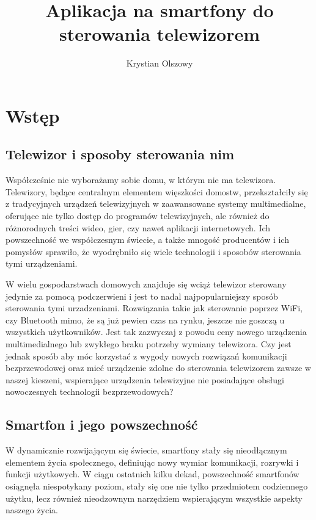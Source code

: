 \documentclass[12pt,twoside]{article}
\author{Krystian Olszowy}
\title{Aplikacja na smartfony do sterowania telewizorem}
\begin{document}
\maketitle

\blankpage

\tableofcontents

\clearpage
\blankpage

\section{Wstęp}
\subsection{Telewizor i sposoby sterowania nim}
Współcześnie nie wyborażamy sobie domu, w którym nie ma telewizora. Telewizory, będące
centralnym elementem więszkości domostw, przekształciły się z tradycyjnych urządzeń
telewizyjnych w zaawansowane systemy multimedialne, oferujące nie tylko dostęp do programów telewizyjnych,
ale również do różnorodnych treści wideo, gier, czy nawet aplikacji internetowych.
Ich powszechność we współczesnym świecie, a także mnogość producentów i ich pomysłów
sprawiło, że wyodrębniło się wiele technologii i sposobów sterowania tymi urządzeniami.

W wielu gospodarstwach domowych znajduje się wciąż telewizor sterowany jedynie za pomocą podczerwieni i jest
to nadal najpopularniejszy sposób sterowania tymi urzadzeniami. Rozwiązania takie jak sterowanie poprzez WiFi, czy Bluetooth
mimo, że są już pewien czas na rynku, jeszcze nie goszczą u wszystkich użytkowników. Jest tak zazwyczaj z powodu ceny
nowego urządzenia multimedialnego lub zwykłego braku potrzeby wymiany telewizora. Czy jest jednak sposób aby
móc korzystać z wygody nowych rozwiązań komunikacji bezprzewodowej oraz mieć urządzenie zdolne do sterowania
telewizorem zawsze w naszej kieszeni, wspierające urządzenia telewizyjne nie posiadające obsługi nowoczesnych technologii bezprzewodowych?

\subsection{Smartfon i jego powszechność}
W dynamicznie rozwijającym się świecie, smartfony stały się nieodłącznym elementem życia społecznego,
definiując nowy wymiar komunikacji, rozrywki i funkcji użytkowych.
W ciągu ostatnich kilku dekad, powszechność smartfonów osiągnęła niespotykany poziom,
stały się one nie tylko przedmiotem codziennego użytku, lecz również nieodzownym
narzędziem wspierającym wszystkie aspekty naszego życia.
\end{document}
